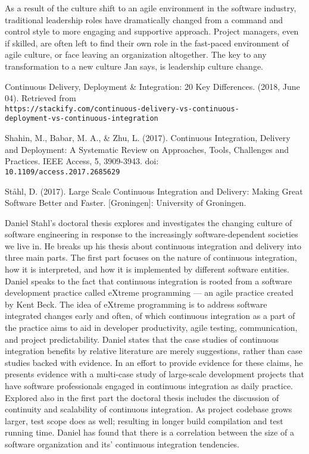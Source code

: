 \documentclass[11pt,a4paper]{article}
\begin{document}
\begin{thebibliography}{6}
\begin{adjustwidth}{1cm}{}
		As a result of the culture shift to an agile environment in the software industry,
		traditional leadership roles have dramatically changed from a command and control
		style to more engaging and supportive approach. Project managers, even if skilled, are
		often left to find their own role in the fast-paced environment of agile culture, or face
		leaving an organization altogether. The key to any transformation to a new culture Jan
		says, is leadership culture change.
	\end{adjustwidth}
	
	 Continuous Delivery, Deployment \& Integration: 20 Key Differences. (2018, June 04). Retrieved from \\\texttt{https://stackify.com/continuous-delivery-vs-continuous-\\deployment-vs-continuous-integration}
	
	 Shahin, M., Babar, M. A., \& Zhu, L. (2017). Continuous Integration, Delivery and Deployment: A Systematic Review on Approaches, Tools, Challenges and Practices. IEEE Access, 5, 3909-3943. doi:\\\texttt{10.1109/access.2017.2685629}
	
	 St\aa hl, D. (2017). Large Scale Continuous Integration and Delivery: Making Great Software Better and Faster. [Groningen]: University of Groningen.
	\begin{adjustwidth}{1cm}{}
		Daniel Stahl’s doctoral thesis explores and investigates the changing culture of software
		engineering in response to the increasingly software-dependent societies we live in. He
		breaks up his thesis about continuous integration and delivery into three main parts.
		The first part focuses on the nature of continuous integration, how it is interpreted, and
		how it is implemented by different software entities. Daniel speaks to the fact that
		continuous integration is rooted from a software development practice called eXtreme
		programming — an agile practice created by Kent Beck. The idea of eXtreme
		programming is to address software integrated changes early and often, of which
		continuous integration as a part of the practice aims to aid in developer productivity,
		agile testing, communication, and project predictability. Daniel states that the case
		studies of continuous integration benefits by relative literature are merely suggestions,
		rather than case studies backed with evidence. In an effort to provide evidence for
		these claims, he presents evidence with a multi-case study of large-scale development
		projects that have software professionals engaged in continuous integration as daily
		practice. Explored also in the first part the doctoral thesis includes the discussion of
		continuity and scalability of continuous integration. As project codebase grows larger,
		test scope does as well; resulting in longer build compilation and test running time.
		Daniel has found that there is a correlation between the size of a software organization
		and its’ continuous integration tendencies.


\end{adjustwidth}
\end{thebibliography}
\end{document}

